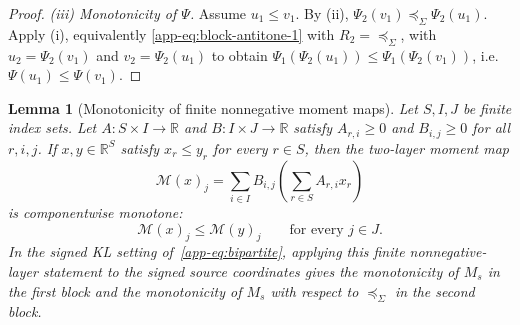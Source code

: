 \documentclass{article}
\theoremstyle{plain}
\newtheorem{lemma}{Lemma}[section]
\newcommand{\RR}{\mathbb{R}}
\begin{document}
\begin{proof}
\noindent\textit{(iii) Monotonicity of $\Psi$.}
Assume $u_1\le v_1$. By (ii),
$\Psi_2(v_1) \preceq_\Sigma \Psi_2(u_1)$.
Apply (i), equivalently \eqref{app-eq:block-antitone-1} with $R_2=\preceq_\Sigma$,
with $u_2=\Psi_2(v_1)$ and $v_2=\Psi_2(u_1)$ to obtain
$\Psi_1(\Psi_2(u_1)) \le \Psi_1(\Psi_2(v_1))$,
i.e. $\Psi(u_1)\le \Psi(v_1)$.
\end{proof}


\begin{lemma}[Monotonicity of finite nonnegative moment maps]\label{app-lem:moment-monotone}
Let $S,I,J$ be finite index sets.  Let $A:S\times I\to\RR$ and
$B:I\times J\to\RR$ satisfy $A_{r,i}\ge0$ and $B_{i,j}\ge0$ for all
$r,i,j$.  If $x,y\in\RR^S$ satisfy $x_r\le y_r$ for every $r\in S$, then
the two-layer moment map
\[
  \mathcal M(x)_j
  =
  \sum_{i\in I} B_{i,j}\left(\sum_{r\in S}A_{r,i}x_r\right)
\]
is componentwise monotone:
\[
  \mathcal M(x)_j\le \mathcal M(y)_j
  \qquad\text{for every }j\in J.
\]
In the signed KL setting of~\eqref{app-eq:bipartite}, applying this finite
nonnegative-layer statement to the signed source coordinates gives the
monotonicity of $M_s$ in the first block and the monotonicity of $M_s$ with
respect to $\preceq_\Sigma$ in the second block.
\end{lemma}
\end{document}
